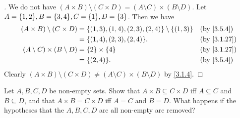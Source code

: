 \begin{proof}[]
	We do not have \((A \times B) \setminus (C \times D) = (A \setminus C) \times (B \setminus D)\).
	Let \(A = \set{1, 2}, B = \set{3, 4}, C = \set{1}, D = \set{3}\).
	Then we have
	\begin{align*}
		(A \times B) \setminus (C \times D)    & = \set{(1, 3), (1, 4), (2, 3), (2, 4)} \setminus \set{(1, 3)} &  & \by{3.5.4}  \\
		                                       & = \set{(1, 4), (2, 3), (2, 4)}.                               &  & \by{3.1.27} \\
		(A \setminus C) \times (B \setminus D) & = \set{2} \times \set{4}                                      &  & \by{3.1.27} \\
		                                       & = \set{(2, 4)}.                                               &  & \by{3.5.4}
	\end{align*}
	Clearly \((A \times B) \setminus (C \times D) \neq (A \setminus C) \times (B \setminus D)\) by \cref{3.1.4}.
\end{proof}

\begin{ex}\label{ex:3.5.6}
	Let \(A, B, C, D\) be non-empty sets.
	Show that \(A \times B \subseteq C \times D\) iff \(A \subseteq C\) and \(B \subseteq D\), and that \(A \times B = C \times D\) iff \(A = C\) and \(B = D\).
	What happens if the hypotheses that the \(A, B, C, D\) are all non-empty are removed?
\end{ex}

